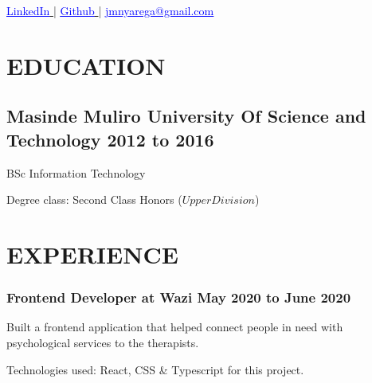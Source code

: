 \documentclass{article}
\author{Josiah Mokobo Nyarega}
\begin{document}
\renewcommand{\maketitle}{
  \begin{center}
    {
      \huge\bfseries
      \theauthor
    }

    \href{https://www.linkedin.com/in/josiah-nyarega-84820a103}{
      \textcolor{blue}{
        \underline{LinkedIn}
      }
    } |
    \href{https://www.github.com/jmnyarega}{
      \textcolor{blue}{
      \underline{Github}
      }
    } |
    \href{jmnyarega@gmail.com}{
      \textcolor{blue}{
        \underline{jmnyarega@gmail.com}
      }
    }
\end{center}
}
\maketitle

\section{EDUCATION}
\subsection{Masinde Muliro University Of Science and Technology\hspace{130pt} \textbf{2012 to 2016}}
\begin{description}[font=$\bullet$~\normalfont\scshape\color{red!50!black}]
  \item{BSc Information Technology}
  \item{Degree class: Second Class Honors (\(Upper Division\))}
\end{description}
\section{EXPERIENCE}
\subsubsection{Frontend Developer at Wazi\hspace{190pt} \textbf{May 2020 to June 2020}}
\begin{description}[font=$\bullet$~\normalfont\scshape\color{red!50!black}]
  \item{Built a frontend application that helped connect people in need with psychological services to the therapists.}
  \item{Technologies used: React, CSS \& Typescript for this project.}
\end{description}
\end{document}
